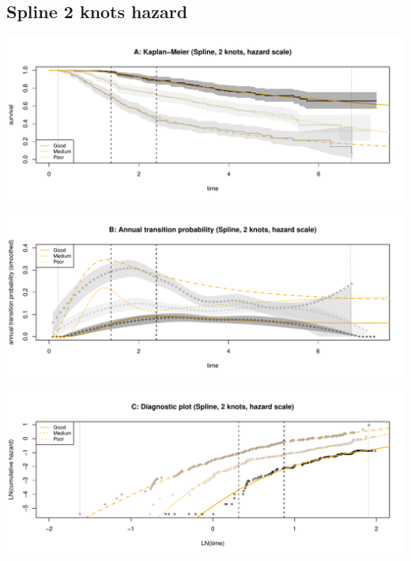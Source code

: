 \documentclass[]{article}
\begin{document}
\newpage

\subsection{Spline 2 knots hazard}\label{spline-2-knots-hazard}

\begin{flushleft}\includegraphics[height=0.25\textheight]{Images/spline_hazard2-1} \end{flushleft}

\begin{flushleft}\includegraphics[height=0.25\textheight]{Images/spline_hazard2-2} \end{flushleft}

\begin{flushleft}\includegraphics[height=0.25\textheight]{Images/spline_hazard2-3} \end{flushleft}
\end{document}
